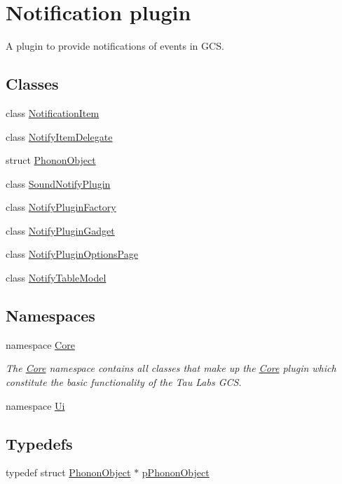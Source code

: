 \hypertarget{group___notify_plugin}{\section{\-Notification plugin}
\label{group___notify_plugin}
}


\-A plugin to provide notifications of events in \-G\-C\-S.  


\subsection*{\-Classes}
\begin{DoxyCompactItemize}
\item 
class \hyperlink{class_notification_item}{\-Notification\-Item}
\item 
class \hyperlink{class_notify_item_delegate}{\-Notify\-Item\-Delegate}
\item 
struct \hyperlink{struct_phonon_object}{\-Phonon\-Object}
\item 
class \hyperlink{class_sound_notify_plugin}{\-Sound\-Notify\-Plugin}
\item 
class \hyperlink{class_notify_plugin_factory}{\-Notify\-Plugin\-Factory}
\item 
class \hyperlink{class_notify_plugin_gadget}{\-Notify\-Plugin\-Gadget}
\item 
class \hyperlink{class_notify_plugin_options_page}{\-Notify\-Plugin\-Options\-Page}
\item 
class \hyperlink{class_notify_table_model}{\-Notify\-Table\-Model}
\end{DoxyCompactItemize}
\subsection*{\-Namespaces}
\begin{DoxyCompactItemize}
\item 
namespace \hyperlink{namespace_core}{\-Core}
\begin{DoxyCompactList}\small\item\em \-The \hyperlink{namespace_core}{\-Core} namespace contains all classes that make up the \hyperlink{namespace_core}{\-Core} plugin which constitute the basic functionality of the \-Tau \-Labs \-G\-C\-S. \end{DoxyCompactList}\item 
namespace \hyperlink{namespace_ui}{\-Ui}
\end{DoxyCompactItemize}
\subsection*{\-Typedefs}
\begin{DoxyCompactItemize}
\item 
typedef struct \hyperlink{struct_phonon_object}{\-Phonon\-Object} $\ast$ \hyperlink{group___notify_plugin_ga29339e638aa7c15d99ff655f2f0e2c89}{p\-Phonon\-Object}
\end{DoxyCompactItemize}

